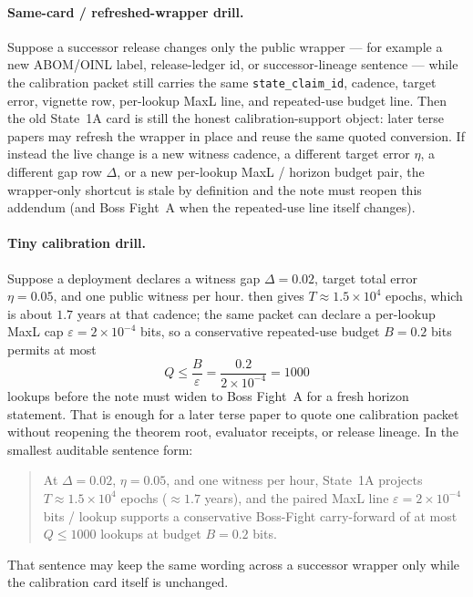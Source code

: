 \documentclass[11pt]{article}
\theoremstyle{definition}
\theoremstyle{remark}
\begin{document}
\paragraph{Same-card / refreshed-wrapper drill.}
Suppose a successor release changes only the public wrapper --- for example a new ABOM/OINL label, release-ledger id, or successor-lineage sentence --- while the calibration packet still carries the same \texttt{state\_claim\_id}, cadence, target error, vignette row, per-lookup MaxL line, and repeated-use budget line.
Then the old State~1A card is still the honest calibration-support object: later terse papers may refresh the wrapper in place and reuse the same quoted conversion.
If instead the live change is a new witness cadence, a different target error $\eta$, a different gap row $\Delta$, or a new per-lookup MaxL / horizon budget pair, the wrapper-only shortcut is stale by definition and the note must reopen this addendum (and Boss Fight~A when the repeated-use line itself changes).

\paragraph{Tiny calibration drill.}
Suppose a deployment declares a witness gap $\Delta=0.02$, target total error $\eta=0.05$, and one public witness per hour.
 then gives $T \approx 1.5\times 10^{4}$ epochs, which is about $1.7$ years at that cadence; the same packet can declare a per-lookup MaxL cap $\varepsilon=2\times 10^{-4}$ bits, so a conservative repeated-use budget $B=0.2$ bits permits at most
\[
Q \le \frac{B}{\varepsilon} = \frac{0.2}{2\times 10^{-4}} = 1000
\]
lookups before the note must widen to Boss Fight~A for a fresh horizon statement.
That is enough for a later terse paper to quote one calibration packet without reopening the theorem root, evaluator receipts, or release lineage.
In the smallest auditable sentence form:
\begin{quote}
At $\Delta=0.02$, $\eta=0.05$, and one witness per hour, State~1A projects $T\approx 1.5\times 10^{4}$ epochs ($\approx 1.7$ years), and the paired MaxL line $\varepsilon=2\times 10^{-4}$ bits / lookup supports a conservative Boss-Fight carry-forward of at most $Q\le 1000$ lookups at budget $B=0.2$ bits.
\end{quote}
That sentence may keep the same wording across a successor wrapper only while the calibration card itself is unchanged.
\end{document}

